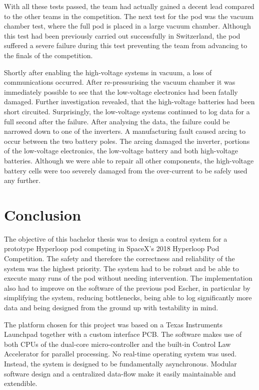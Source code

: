 With all these tests passed, the team had actually gained a decent lead compared to the other teams in the competition. The next test for the pod was the vacuum chamber test, where the full pod is placed in a large vacuum chamber. Although this test had been previously carried out successfully in Switzerland, the pod suffered a severe failure during this test preventing the team from advancing to the finals of the competition.

Shortly after enabling the high-voltage systems in vacuum, a loss of communications occurred. After re-pressurising the vacuum chamber it was immediately possible to see that the low-voltage electronics had been fatally damaged. Further investigation revealed, that the high-voltage batteries had been short circuited. Surprisingly, the low-voltage systems continued to log data for a full second after the failure. After analysing the data, the failure could be narrowed down to one of the inverters. A manufacturing fault caused arcing to occur between the two battery poles. The arcing damaged the inverter, portions of the low-voltage electronics, the low-voltage battery and both high-voltage batteries. Although we were able to repair all other components, the high-voltage battery cells were too severely damaged from the over-current to be safely used any further.

\section{Conclusion}


The objective of this bachelor thesis was to design a control system for a prototype Hyperloop pod competing in SpaceX's 2018 Hyperloop Pod Competition. The safety and therefore the correctness and reliability of the system was the highest priority. The system had to be robust and be able to execute many runs of the pod without needing intervention. The implementation also had to improve on the software of the previous pod Escher, in particular by simplifying the system, reducing bottlenecks, being able to log significantly more data and being designed from the ground up with testability in mind.


The platform chosen for this project was based on a Texas Instruments Launchpad together with a custom interface PCB. The software makes use of both CPUs of the dual-core micro-controller and the built-in Control Law Accelerator for parallel processing. No real-time operating system was used. Instead, the system is designed to be fundamentally asynchronous. Modular software design and a centralized data-flow make it easily maintainable and extendible.

